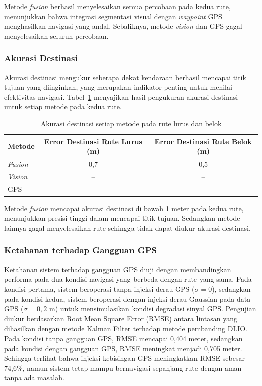 Metode \emph{fusion} berhasil menyelesaikan semua percobaan pada kedua rute, menunjukkan bahwa integrasi segmentasi visual dengan \emph{waypoint} GPS menghasilkan navigasi yang andal.
Sebaliknya, metode \emph{vision} dan GPS gagal menyelesaikan seluruh percobaan.

\subsubsection{Akurasi Destinasi}
\label{sec:dest_accuracy}

Akurasi destinasi mengukur seberapa dekat kendaraan berhasil mencapai titik tujuan yang diinginkan, yang merupakan indikator penting untuk menilai efektivitas navigasi. 
Tabel~\ref{tab:dest_accuracy} menyajikan hasil pengukuran akurasi destinasi untuk setiap metode pada kedua rute.

\begin{table}[H]
\centering
\caption{Akurasi destinasi setiap metode pada rute lurus dan belok}
\label{tab:dest_accuracy}
\begin{tabular}{l c c}
\hline
\textbf{Metode} & \textbf{Error Destinasi Rute Lurus (m)} & \textbf{Error Destinasi Rute Belok (m)} \\
\hline
\emph{Fusion}  & 0,7 & 0,5 \\
\emph{Vision}  & -- & -- \\
GPS            & -- & -- \\
\hline
\end{tabular}
\end{table}

Metode \emph{fusion} mencapai akurasi destinasi di bawah 1 meter pada kedua rute, menunjukkan presisi tinggi dalam mencapai titik tujuan.
Sedangkan metode lainnya gagal menyelesaikan rute sehingga tidak dapat diukur akurasi destinasi.

\subsubsection{Ketahanan terhadap Gangguan GPS}
\label{sec:noise_robustness}

Ketahanan sistem terhadap gangguan GPS diuji dengan membandingkan performa pada dua kondisi navigasi yang berbeda dengan rute yang sama.
Pada kondisi pertama, sistem beroperasi tanpa injeksi derau GPS ($\sigma = 0$), sedangkan pada kondisi kedua, sistem beroperasi dengan injeksi derau Gaussian pada data GPS ($\sigma = 0,2$ m) untuk mensimulasikan kondisi degradasi sinyal GPS.
Pengujian diukur berdasarkan Root Mean Square Error (RMSE) antara lintasan yang dihasilkan dengan metode Kalman Filter terhadap metode pembanding DLIO.
Pada kondisi tanpa gangguan GPS, RMSE mencapai 0,404 meter, sedangkan pada kondisi dengan gangguan GPS, RMSE meningkat menjadi 0,705 meter.
Sehingga terlihat bahwa injeksi kebisingan GPS meningkatkan RMSE sebesar 74,6\%, namun sistem tetap mampu bernavigasi sepanjang rute dengan aman tanpa ada masalah.
